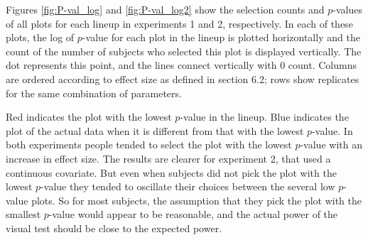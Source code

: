\documentclass[12pt]{article}
\begin{document}
Figures \ref{fig:P-val_log} and \ref{fig:P-val_log2} show the selection counts and $p$-values of all plots for each lineup in experiments 1 and 2, respectively. In each of these plots, the log of $p$-value for each plot in the lineup is plotted horizontally and the count of the number of subjects who selected this plot is displayed vertically. The dot represents this point, and the lines connect vertically with 0 count. Columns are ordered according to effect size as defined in section 6.2; rows show replicates for the same combination of parameters.


Red indicates the plot with the lowest $p$-value in the lineup. Blue indicates the plot of the actual data when it is different from that with the lowest $p$-value. In both experiments  people tended to select the plot with the lowest $p$-value with an increase in effect size.
 The results are clearer for experiment 2, that used a continuous covariate. But even when subjects did not pick the plot with the lowest $p$-value they tended to oscillate their choices between the several low $p$-value plots. So for most subjects, the assumption that they pick the plot with the smallest $p$-value would appear to be reasonable, and the actual power of the visual test should be close to the expected power.
\end{document}
